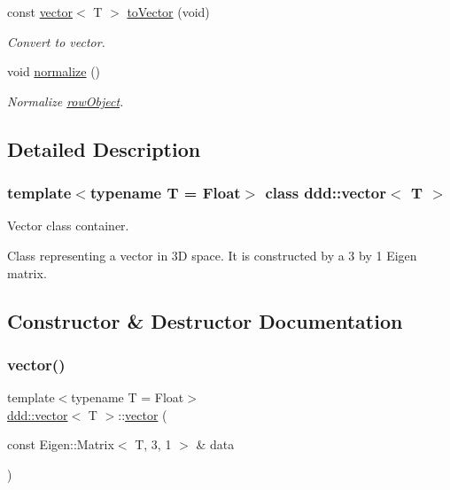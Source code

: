 \begin{DoxyCompactItemize}
const \hyperlink{classddd_1_1vector}{vector}$<$ T $>$ \hyperlink{classddd_1_1row_object_a59fbb28dfc75528f20a0032f6a7bdccd}{to\+Vector} (void)
\begin{DoxyCompactList}\small\item\em Convert to vector. \end{DoxyCompactList}\item 
\mbox{\label{classddd_1_1row_object_ad567bf2ca914b05a544b73bcec70cc57}} 
void \hyperlink{classddd_1_1row_object_ad567bf2ca914b05a544b73bcec70cc57}{normalize} ()
\begin{DoxyCompactList}\small\item\em Normalize \hyperlink{classddd_1_1row_object}{row\+Object}. \end{DoxyCompactList}\end{DoxyCompactItemize}


\subsection{Detailed Description}
\subsubsection*{template$<$typename T = Float$>$\newline
class ddd\+::vector$<$ T $>$}

Vector class container. 

Class representing a vector in 3D space. It is constructed by a 3 by 1 Eigen matrix. 

\subsection{Constructor \& Destructor Documentation}
\mbox{\label{classddd_1_1vector_a5dec8f05a011372b6b2795827607e6b2}} 
\subsubsection{\texorpdfstring{vector()}{vector()}\hspace{0.1cm}{\footnotesize\ttfamily [1/3]}}
{\footnotesize\ttfamily template$<$typename T = Float$>$ \\
\hyperlink{classddd_1_1vector}{ddd\+::vector}$<$ T $>$\+::\hyperlink{classddd_1_1vector}{vector} (\begin{DoxyParamCaption}\item[{const Eigen\+::\+Matrix$<$ T, 3, 1 $>$ \&}]{data }\end{DoxyParamCaption})\hspace{0.3cm}{\ttfamily [inline]}}



